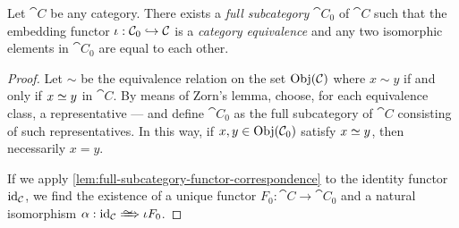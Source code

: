 \begin{lemma}
\label{lem:full-subcategory-embedding-equivalence}
Let \(\cat C\) be any category. There exists a \emph{full subcategory}
\(\cat C_0\) of \(\cat C\) such that the embedding functor
\(\iota: \mathcal C_0 \hookrightarrow \mathcal C\) is a \emph{category equivalence} and any two
isomorphic elements in \(\cat C_0\) are equal to each other.
\end{lemma}

\begin{proof}
Let \(\sim\) be the equivalence relation on the set \(\operatorname{Obj}(\mathcal C)\) where
\(x \sim y\) if and only if \(x \simeq y\) in \(\cat C\). By means of Zorn's
lemma, choose, for each equivalence class, a representative --- and define
\(\cat C_0\) as the full subcategory of \(\cat C\) consisting of such
representatives. In this way, if \(x, y \in \operatorname{Obj}(\mathcal C_0)\) satisfy
\(x \simeq y\), then necessarily \(x = y\).

If we apply \cref{lem:full-subcategory-functor-correspondence} to the identity
functor \(\operatorname{id}_{\mathcal C}\), we find the existence of a unique functor
\(F_0: \cat C \to \cat C_0\) and a natural isomorphism \(\alpha: \Id_{\cat C}
\isonat \iota F_0\).
\end{proof}
